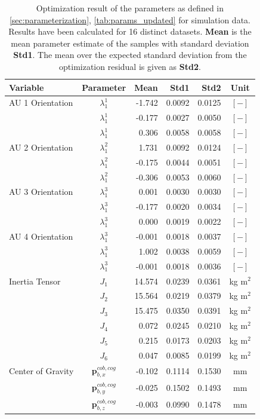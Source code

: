 \vspace*{\fill}
\begin{table}[H]
\captionsetup{width=0.9\textwidth}
\centering
\caption{Optimization result of the parameters as defined in \cref{sec:parameterization}, \cref{tab:params_updated} for simulation data. Results have been calculated for 16 distinct datasets. \textbf{Mean} is the mean parameter estimate of the samples with standard deviation \textbf{Std1}. The mean over the expected standard deviation from the optimization residual is given as \textbf{Std2}.}
\begin{tabular}{lcrrrc}
Variable & Parameter & Mean & Std1 & Std2 & Unit \\
\hline \hline
AU 1 Orientation & $\lambda_1^1$ & -1.742 & 0.0092 & 0.0125 & $[-]$ \\
                 & $\lambda_1^1$ & -0.177 & 0.0027 & 0.0050 & $[-]$ \\
                 & $\lambda_1^1$ &  0.306 & 0.0058 & 0.0058 & $[-]$ \\
AU 2 Orientation & $\lambda_1^2$ &  1.731 & 0.0092 & 0.0124 & $[-]$ \\
                 & $\lambda_1^2$ & -0.175 & 0.0044 & 0.0051 & $[-]$ \\
                 & $\lambda_1^2$ & -0.306 & 0.0053 & 0.0060 & $[-]$ \\
AU 3 Orientation & $\lambda_1^3$ &  0.001 & 0.0030 & 0.0030 & $[-]$ \\
                 & $\lambda_1^3$ & -0.177 & 0.0020 & 0.0034 & $[-]$ \\
                 & $\lambda_1^3$ &  0.000 & 0.0019 & 0.0022 & $[-]$ \\
AU 4 Orientation & $\lambda_1^3$ & -0.001 & 0.0018 & 0.0037 & $[-]$ \\
                 & $\lambda_1^3$ &  1.002 & 0.0038 & 0.0059 & $[-]$ \\
                 & $\lambda_1^3$ & -0.001 & 0.0018 & 0.0036 & $[-]$ \\
\hline
Inertia Tensor & $J_1$ & 14.574 & 0.0239 & 0.0361 & kg m$^2$ \\
               & $J_2$ & 15.564 & 0.0219 & 0.0379 & kg m$^2$ \\
               & $J_3$ & 15.475 & 0.0350 & 0.0391 & kg m$^2$ \\
               & $J_4$ &  0.072 & 0.0245 & 0.0210 & kg m$^2$ \\
               & $J_5$ &  0.215 & 0.0173 & 0.0203 & kg m$^2$ \\
               & $J_6$ &  0.047 & 0.0085 & 0.0199 & kg m$^2$ \\
\hline
Center of Gravity & $\mathbf{p}_{b,x}^{cob,cog}$ & -0.102 & 0.1114 & 0.1530 & mm \\
                  & $\mathbf{p}_{b,y}^{cob,cog}$ & -0.025 & 0.1502 & 0.1493 & mm \\
                  & $\mathbf{p}_{b,z}^{cob,cog}$ & -0.003 & 0.0990 & 0.1478 & mm \\
\hline
\end{tabular}
\end{table}
\vspace*{\fill}

